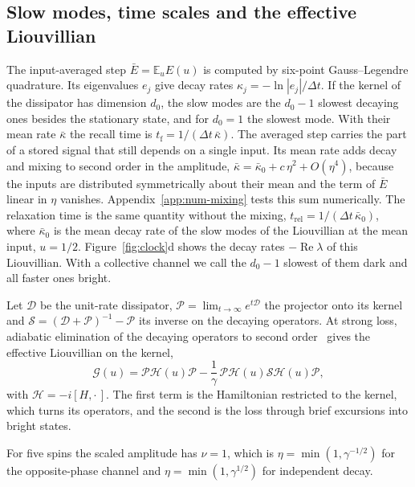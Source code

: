 \subsection{Slow modes, time scales and the effective Liouvillian}
\label{sec:methods-slow}
The input-averaged step $\bar E=\mathbb E_uE(u)$ is computed by six-point Gauss--Legendre quadrature. Its eigenvalues
$e_j$ give decay rates $\kappa_j=-\ln|e_j|/\Delta t$. If the kernel of the dissipator has dimension $d_0$, the slow
modes are the $d_0-1$ slowest decaying ones besides the stationary state, and for $d_0=1$ the slowest mode. With
their mean rate $\bar\kappa$ the recall time is $t_{\mathrm f}=1/(\Delta t\,\bar\kappa)$. The averaged step carries
the part of a stored signal that still depends on a single input. Its mean rate adds decay and mixing to second
order in the amplitude, $\bar\kappa=\bar\kappa_0+c\,\eta^2+O(\eta^4)$, because the inputs are distributed
symmetrically about their mean and the term of $\bar E$ linear in $\eta$ vanishes. Appendix~\ref{app:num-mixing}
tests this sum numerically. The relaxation time is the same quantity without the mixing,
$t_{\mathrm{rel}}=1/(\Delta t\,\bar\kappa_0)$, where $\bar\kappa_0$ is the mean decay rate of the slow modes of the
Liouvillian at the mean input, $u=1/2$. Figure~\ref{fig:clock}d shows the decay rates $-\operatorname{Re}\lambda$ of
this Liouvillian. With a collective channel we call the $d_0-1$ slowest of them dark and all faster ones bright.

Let $\mathcal D$ be the unit-rate dissipator, $\mathcal P=\lim_{t\to\infty}e^{t\mathcal D}$ the projector onto its
kernel and $\mathcal S=(\mathcal D+\mathcal P)^{-1}-\mathcal P$ its inverse on the decaying operators. At strong loss,
adiabatic elimination of the decaying operators to second order~\cite{Zanardi2014,Reiter2012} gives the effective
Liouvillian on the kernel,
\begin{equation}
  \mathcal G(u)=\mathcal P\mathcal H(u)\mathcal P-\frac1\gamma\,\mathcal P\mathcal H(u)\mathcal S\mathcal H(u)\mathcal P ,
  \label{eq:reduced}
\end{equation}
with $\mathcal H=-i[H,\cdot\,]$. The first term is the Hamiltonian restricted to the kernel, which turns its
operators, and the second is the loss through brief excursions into bright states.

For five spins the scaled amplitude has $\nu=1$, which is $\eta=\min(1,\gamma^{-1/2})$ for the opposite-phase
channel and $\eta=\min(1,\gamma^{1/2})$ for independent decay.

